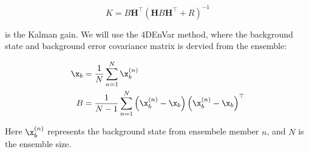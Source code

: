 \[
K = B\mathbf{H}^\top\left(\mathbf{H}B\mathbf{H}^\top + R\right)^{-1}
\]

is the Kalman gain. We will use the 4DEnVar method, where the background state and background error covariance matrix is dervied from the ensemble:

\begin{align*}
    \x_b &= \frac 1 N \sum_{n=1}^N \x_b^{(n)} \\
    B &= \frac{1}{N - 1} \sum_{n=1}^N \left(\x_b^{(n)} - \x_b\right)\left(\x_b^{(n)} - \x_b\right)^\top
\end{align*}

Here $\x_b^{(n)}$ represents the background state from ensembele member $n$, and $N$ is the ensemble size.